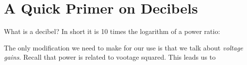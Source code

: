 \documentclass{handout}
\begin{document}

\newpage
\clearpage
\pagebreak

\section{A Quick Primer on Decibels}
What is a decibel?  In short it is 10 times the  logarithm of a power ratio:
\soln{1in}{
\[
dB = 10\log \frac{P_{out}}{P_{in}}
\]
}

The only modification we need to make for our use is that we talk about {\em voltage gains}.  Recall that power is related to vootage squared.  This leads us to
\soln{1in}{
\[
dB =  10\log \left[\frac{V_{out}}{V_{in}}\right]^2 = 20\log \frac{V_{out}}{V_{in}}
\]
}
\end{document}
